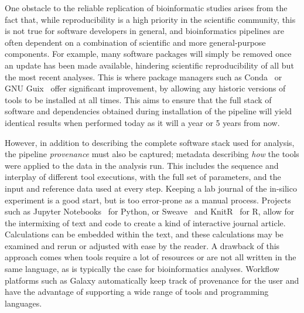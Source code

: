 \begin{justify}

One obstacle to the reliable replication of bioinformatic studies arises from the fact that, while reproducibility is a high priority in the scientific community, this is not true for software developers in general, and bioinformatics pipelines are often dependent on a combination of scientific and more general-purpose components. For example, many software packages will simply be removed once an update has been made available, hindering scientific reproducibility of all but the most recent analyses. This is where package managers such as Conda~\cite{conda} or GNU Guix~\cite{courtes2013functional} offer significant improvement, by allowing any historic versions of tools to be installed at all times. This aims to ensure that the full stack of software and dependencies obtained during installation of the pipeline will yield identical results when performed today as it will a year or 5 years from now.

However, in addition to describing the complete software stack used for analysis, the pipeline \emph{provenance} must also be captured; metadata describing \emph{how} the tools were applied to the data in the analysis run. This includes the sequence and interplay of different tool executions, with the full set of parameters, and the input and reference data used at every step. Keeping a lab journal of the in-silico experiment is a good start, but is too error-prone as a manual process. Projects such as Jupyter Notebooks~\cite{kluyver2016jupyter} for Python, or Sweave~\cite{leisch2002sweave} and KnitR~\cite{xie2014knitr} for R, allow for the intermixing of text and code to create a kind of interactive journal article. Calculations can be embedded within the text, and these calculations may be examined and rerun or adjusted with ease by the reader. A drawback of this approach comes when tools require a lot of resources or are not all written in the same language, as is typically the case for bioinformatics analyses. Workflow platforms such as Galaxy automatically keep track of provenance for the user and have the advantage of supporting a wide range of tools and programming languages.


\end{justify}
